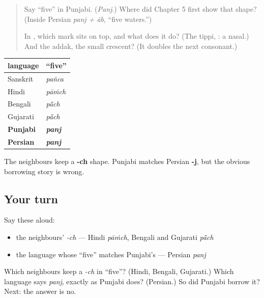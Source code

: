 \begin{quote}
Say “five” in Punjabi. (\emph{Panj}.) Where did Chapter 5 first show that shape? (Inside Persian \emph{panj + āb}, “five waters.”)

In \textbf{}, which mark sits on top, and what does it do? (The tippi, \textbf{}: a nasal.) And the addak, the small crescent? (It doubles the next consonant.)
\end{quote}

\begin{grammarlens}[title={What you've built: the surprising family comparison}]
\noindent
\begin{tabularx}{\linewidth}{@{}>{\raggedright\arraybackslash}X>{\raggedright\arraybackslash}X@{}}
\toprule
\textbf{language} & \textbf{“five”} \\
\midrule
Sanskrit & \emph{pañca} \\
Hindi & \emph{pāṁch} \\
Bengali & \emph{pā̃ch} \\
Gujarati & \emph{pā̃ch} \\
\textbf{Punjabi} & \emph{\textbf{panj}} \\
\textbf{Persian} & \emph{\textbf{panj}} \\
\bottomrule
\end{tabularx}

The neighbours keep a \textbf{-ch} shape. Punjabi matches Persian \textbf{-j}, but the obvious borrowing story is wrong.
\end{grammarlens}

\subsection*{Your turn}
Say these aloud:

\begin{itemize}
\raggedright
  \item the neighbours' \emph{-ch} — Hindi \emph{pāṁch}, Bengali and Gujarati \emph{pā̃ch}
  \item the language whose \textquotedblleft{}five\textquotedblright{} matches Punjabi's — Persian \emph{panj}
\end{itemize}

\begin{tcolorbox}[breakable,colback=teal!4,colframe=teal!35!black,title={Before you move on}]
Which neighbours keep a \emph{-ch} in \textquotedblleft{}five\textquotedblright{}? (Hindi, Bengali, Gujarati.) Which language says \emph{panj}, exactly as Punjabi does? (Persian.) So did Punjabi borrow it? Next: the answer is no.
\end{tcolorbox}
